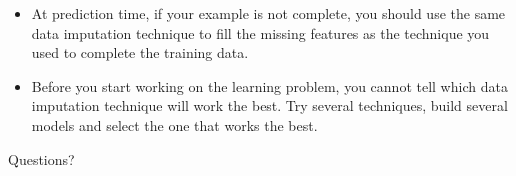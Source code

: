 \documentclass[9pt,dvipsnames]{beamer}
\begin{document}
	\begin{frame}
		\begin{itemize}
			\item At prediction time, if your example is not complete, you should use the same data imputation technique to fill the missing features as the technique you used to complete the training data.
			\item Before you start working on the learning problem, you cannot tell which data imputation technique will work the best. Try several techniques, build several models and select the one that works the best.
		\end{itemize}
	\end{frame}
	
	\begin{frame}
		\begin{center}
			\Huge Questions?
		\end{center}
	\end{frame}
\end{document}
